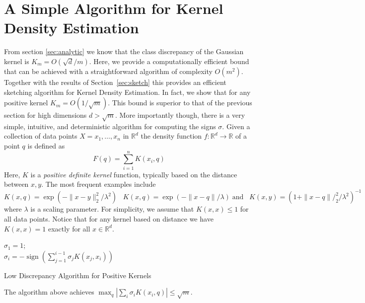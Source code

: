 \documentclass[anon,12pt]{colt2019} %
\newcommand{\R}{\mathbb{R}}
\begin{document}
{\section{A Simple Algorithm for Kernel Density Estimation}
From section \ref{sec:analytic} we know that the class discrepancy of the Gaussian kernel is $K_m = O(\sqrt{d}/m)$. 
Here, we provide a computationally efficient bound that can be achieved with a straightforward algorithm of complexity $O(m^2)$. Together with the results of Section~\ref{sec:sketch} this provides an efficient sketching algorithm for Kernel Density Estimation. 
In fact, we show that for any positive kernel $K_m = O(1/\sqrt{m})$. This bound is superior to that of the previous section for high dimensions $d > \sqrt{m}$. More importantly though, there is a very simple, intuitive, and deterministic algorithm for computing the signs $\sigma$. 
Given a collection of data points $X = x_1,\ldots, x_n$ in $\R^d$ the density function $f: \R^d \rightarrow \R$ of a point $q$ is defined as 
$$ F(q) = \sum_{i=1}^{n} K(x_i,q) $$
Here, $K$ is a \emph{positive definite kernel} function, typically based on the distance between $x,y$. The most frequent examples include
$$ K(x,q) = \exp(- \|x-y\|_2^2/\lambda^2)\;\;\; K(x,q) = \exp(- \|x-q\|/\lambda) \; \mbox{and}\;\;\; K(x,y) = (1+\|x-q\|/_2^2/\lambda^2)^{-1}$$
where $\lambda$ is a scaling parameter. For simplicity, we assume that $K(x,x) \leq 1$ for all data points. Notice that for any kernel based on distance we have $K(x,x)=1$ exactly for all $x \in \R^d$.

\begin{algorithm}[H]
 \KwData{Kernel function $K:(\R^d,\R^d)\rightarrow[0,1]$, points  $x_1,\ldots,x_m$}
 $\sigma_1 = 1$;\\
 {$\sigma_i = -\operatorname{sign} (\sum_{j=1}^{i-1}\sigma_j  K(x_j, x_i))$}
\caption{Low Discrepancy Algorithm for Positive Kernels}
\end{algorithm}


\begin{theorem} \label{thm:disc simple kernel}
The algorithm above achieves $\max_q |\sum_i \sigma_i K(x_i,q) | \le \sqrt{m}$.
\end{theorem}

}
\end{document}
